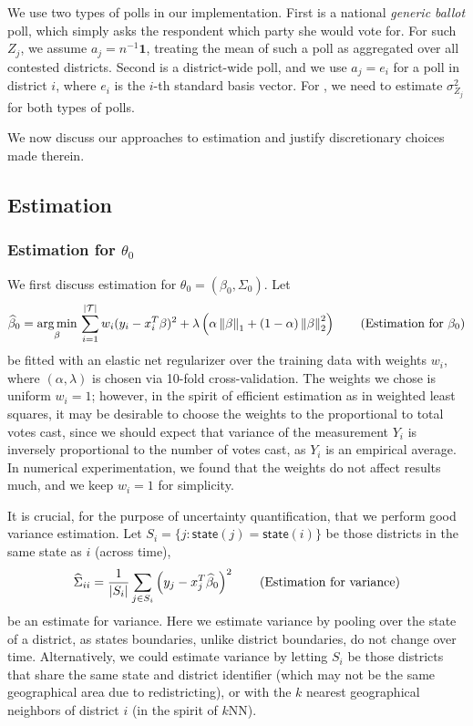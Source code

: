 \documentclass[11pt]{article}
\begin{document}
We use two types of polls in our implementation. First is a national
\emph{generic ballot} poll, which simply asks the respondent which party she
would vote for. For such $Z_j$, we assume $a_j = n^{-1} \bm 1$, treating the
mean of such a poll as aggregated over all contested districts. Second is a
district-wide poll, and we use $a_j = e_i$ for a poll in district $i$, where
$e_i$ is the $i$-th standard basis vector. For , we need to
estimate $\sigma_{Z_j}^2$ for both types of polls.

We now discuss our approaches to estimation and justify discretionary choices
made therein. 

\subsection{Estimation}
\label{sec:estimate}
\subsubsection{Estimation for $\theta_0$}
We first discuss estimation for $\theta_0 = (\beta_0, \Sigma_0)$.
Let \begin{equation}
\widehat \beta_0 = \operatorname*{arg\,min}_\beta \, \sum_{i=1}^{|\mathcal T|} w_i (y_i - x_i^T
\beta)^2
+ \lambda
\left({\alpha \left\lVert\beta\right\rVert_1 + (1-\alpha) \left\lVert\beta\right\rVert_2^2}\right)
\tag{Estimation for $\beta_0$}
\label{eq:beta}
\end{equation}
be fitted with an elastic net regularizer over the training data with weights
$w_i$,
where
$(\alpha, \lambda)$ is chosen via 10-fold cross-validation. The weights we chose is uniform $w_i = 1$; however, in the spirit of efficient
estimation as in weighted least
squares, it may be desirable to choose the weights to the proportional to total
votes cast, since we should expect that variance of the measurement $Y_i$ is
inversely proportional to the number of votes cast, as $Y_i$ is an empirical
average. In numerical experimentation, we found that the weights do not affect
results much, and we keep $w_i = 1$ for simplicity.

It is crucial, for the purpose of uncertainty quantification, that we perform good variance estimation. Let $S_i = \{j: \mathsf{state}(j) = 
\mathsf{state}(i)\}$ be those districts in the same state as $i$ (across time),
\[
\widehat \Sigma_{ii} = \frac{1}{|S_i|} \sum_{j\in S_i}
\left({y_j
- x_j^T \widehat \beta_0}\right)^2 \tag{Estimation for variance}
\label{eq:var}
\]
be an estimate for variance. Here we estimate variance by pooling over the state
of a district, as states boundaries, unlike district boundaries, do not change
over time. Alternatively, we could estimate variance by letting $S_i$ be those
districts that share the same state and district identifier (which may not be
the same geographical area due to redistricting), or with the $k$ nearest geographical neighbors of district $i$ (in the spirit of $k$NN). 
\end{document}
